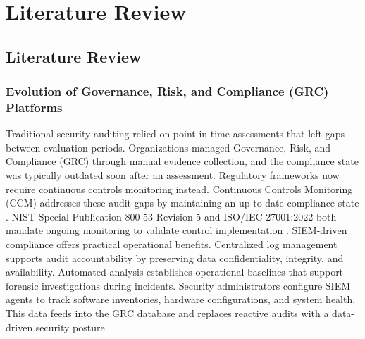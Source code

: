\chapter{Literature Review}

\section{Literature Review}

\subsection{Evolution of Governance, Risk, and Compliance (GRC) Platforms}
Traditional security auditing relied on point-in-time assessments that left gaps between evaluation periods. Organizations managed Governance, Risk, and Compliance (GRC) through manual evidence collection, and the compliance state was typically outdated soon after an assessment. Regulatory frameworks now require continuous controls monitoring instead. Continuous Controls Monitoring (CCM) addresses these audit gaps by maintaining an up-to-date compliance state \cite{best2023auditing}. NIST Special Publication 800-53 Revision 5 and ISO/IEC 27001:2022 both mandate ongoing monitoring to validate control implementation \cite{nist80053r5, quispe2026enhancing}. SIEM-driven compliance offers practical operational benefits. Centralized log management supports audit accountability by preserving data confidentiality, integrity, and availability. Automated analysis establishes operational baselines that support forensic investigations during incidents. Security administrators configure SIEM agents to track software inventories, hardware configurations, and system health. This data feeds into the GRC database and replaces reactive audits with a data-driven security posture.

